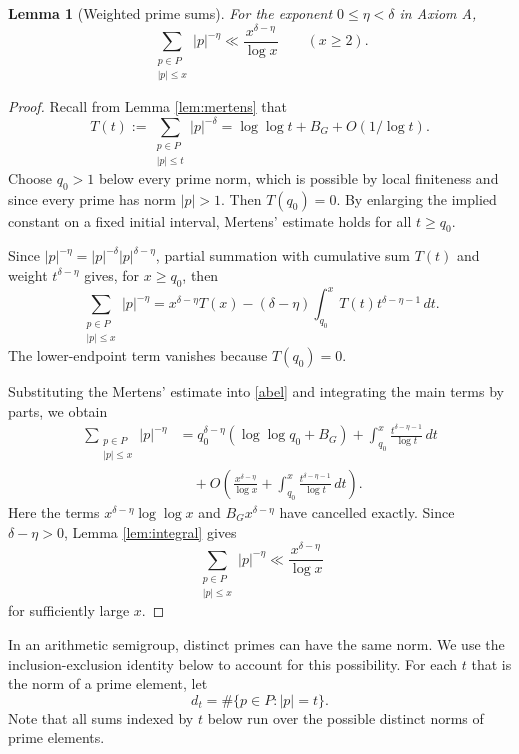 \documentclass[10pt,a4paper]{amsart}
\newtheorem{lemma}[theorem]{Lemma}
\begin{document}
\begin{lemma}[Weighted prime sums]\label{lem:weighted}
For the exponent $0\le\eta<\delta$ in Axiom A,
\[
\sum_{\substack{p\in P\\|p|\le x}}|p|^{-\eta}
\ll\frac{x^{\delta-\eta}}{\log x}
\qquad(x\ge2).
\]
\end{lemma}

\begin{proof}
Recall from Lemma \ref{lem:mertens} that
\[
T(t):=\sum_{\substack{p\in P\\|p|\le t}}|p|^{-\delta}
=\log\log t+B_G+O(1/\log t).
\]
Choose $q_0>1$ below every prime norm, which is
possible by local finiteness and since every prime has norm $|p| > 1$. Then $T(q_0)=0$.
By enlarging the implied constant on a fixed initial
interval, Mertens' estimate holds for all $t\ge q_0$.

Since $|p|^{-\eta}=|p|^{-\delta}|p|^{\delta-\eta}$,
partial summation with cumulative sum $T(t)$ and
weight $t^{\delta-\eta}$ gives, for $x\ge q_0$, then
\begin{equation}\label{abel}
\sum_{\substack{p\in P\\|p|\le x}}|p|^{-\eta}
=x^{\delta-\eta}T(x)-(\delta-\eta)\int_{q_0}^x
T(t)t^{\delta-\eta-1}\,dt.
\end{equation}
The lower-endpoint term vanishes because $T(q_0)=0$.

Substituting the Mertens' estimate into \eqref{abel}
and integrating the main terms by parts, we obtain
\begin{align*}
\sum_{\substack{p\in P\\|p|\le x}}|p|^{-\eta}
&=
q_0^{\delta-\eta}(\log\log q_0+B_G)
+\int_{q_0}^x\frac{t^{\delta-\eta-1}}{\log t}\,dt\\
&\quad+
O\!\left(
\frac{x^{\delta-\eta}}{\log x}
+\int_{q_0}^x\frac{t^{\delta-\eta-1}}{\log t}\,dt
\right).
\end{align*}
Here the terms $x^{\delta-\eta}\log\log x$ and
$B_Gx^{\delta-\eta}$ have cancelled exactly.
Since $\delta-\eta>0$, Lemma \ref{lem:integral} gives
\[
\sum_{\substack{p\in P\\|p|\le x}}|p|^{-\eta}
\ll\frac{x^{\delta-\eta}}{\log x}
\]
for sufficiently large $x$.
\end{proof}
In an arithmetic semigroup, distinct primes can have the same
norm. We use the inclusion-exclusion identity below to account for
this possibility.
For each $t$ that is the norm of a prime element, let
\[
d_t=\#\{p\in P:|p|=t\}.
\]
Note that all sums indexed by $t$ below run over the possible distinct norms
of prime elements.
\end{document}
